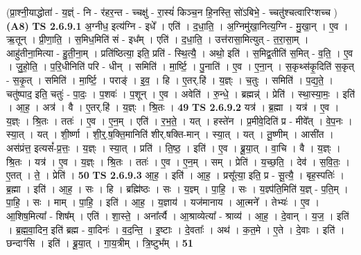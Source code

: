 \documentclass[17pt]{extarticle}
\begin{document}
                      (प्रा॒श्नी॒याद्धोता॑ - य॒ज्ञ्ं - नि - र॑हर॒न्त - च्चक्षु॑ - रा॒स्यं॑ किञ्च॒न हि॒नस्ति॒ सो॑ऽबिभे॒ - च्चतु॑श्चत्वारिꣳशच्च )  \textbf{(A8)} \newline \newline
                                \textbf{ TS 2.6.9.1} \newline
                  अ॒ग्नीध॒ इत्य॑ग्नि - इधे᳚ । एति॑ । द॒धा॒ति॒ । अ॒ग्निमु॑खा॒नित्य॒ग्नि - मु॒खा॒न् । ए॒व । ऋ॒तून् । प्री॒णा॒ति॒ । स॒मिध॒मिति॑ सं - इध᳚म् । एति॑ । द॒धा॒ति॒ । उत्त॑रासा॒मित्युत् - त॒रा॒सा॒म् । आहु॑तीना॒मित्या - हु॒ती॒ना॒म् । प्रति॑ष्ठित्या॒ इति॒ प्रति॑ - स्थि॒त्यै॒ । अथो॒ इति॑ । स॒मिद्व॒तीति॑ स॒मित् - व॒ति॒ । ए॒व । जु॒हो॒ति॒ । प॒रि॒धीनिति॑ परि - धीन् । समिति॑ । मा॒र्ष्टि॒ । पु॒नाति॑ । ए॒व । ए॒ना॒न् । स॒कृथ्स॑कृ॒दिति॑ स॒कृत् - स॒कृ॒त् । समिति॑ । मा॒र्ष्टि॒ । पराङ्॑ । इ॒व॒ । हि । ए॒तर्.हि॑ । य॒ज्ञ्ः । च॒तुः । समिति॑ । प॒द्य॒ते॒ । चतु॑ष्पाद॒ इति॒ चतुः॑ - पा॒दः॒ । प॒शवः॑ । प॒शून् । ए॒व । अवेति॑ । रु॒न्धे॒ । ब्रह्मन्न्॑ । प्रेति॑ । स्था॒स्या॒मः॒ । इति॑ । आ॒ह॒ । अत्र॑ । वै । ए॒तर्.हि॑ । य॒ज्ञ्ः । श्रि॒तः । \textbf{  49} \newline
                  \newline
                                \textbf{ TS 2.6.9.2} \newline
                  यत्र॑ । ब्र॒ह्मा । यत्र॑ । ए॒व । य॒ज्ञ्ः । श्रि॒तः । ततः॑ । ए॒व । ए॒न॒म् । एति॑ । र॒भ॒ते॒ । यत् । हस्ते॑न । प्र॒मीवे॒दिति॑ प्र - मीवे᳚त् । वे॒प॒नः । स्या॒त् । यत् । शी॒र्ष्णा । शी॒र्॒.ष॒क्ति॒मानिति॑ शीर्.षक्ति-मान् । स्या॒त् । यत् । तू॒ष्णीम् । आसी॑त । अस॑प्रंत्त॒ इत्यसं᳚-प्र॒त्तः॒ । य॒ज्ञ्ः । स्या॒त् । प्रति॑ । ति॒ष्ठ॒ । इति॑ । ए॒व । ब्रू॒या॒त् । वा॒चि । वै । य॒ज्ञ्ः । श्रि॒तः । यत्र॑ । ए॒व । य॒ज्ञ्ः । श्रि॒तः । ततः॑ । ए॒व । ए॒न॒म् । सम् । प्रेति॑ । य॒च्छ॒ति॒ । देव॑ । स॒वि॒तः॒ । ए॒तत् । ते॒ । प्रेति॑ । \textbf{  50} \newline
                  \newline
                                \textbf{ TS 2.6.9.3} \newline
                  आ॒ह॒ । इति॑ । आ॒ह॒ । प्रसू᳚त्या॒ इति॒ प्र - सू॒त्यै॒ । बृह॒स्पतिः॑ । ब्र॒ह्मा । इति॑ । आ॒ह॒ । सः । हि । ब्रह्मि॑ष्ठः । सः । य॒ज्ञ्म् । पा॒हि॒ । सः । य॒ज्ञ्प॑ति॒मिति॑ य॒ज्ञ् - प॒ति॒म् । पा॒हि॒ । सः । माम् । पा॒हि॒ । इति॑ । आ॒ह॒ । य॒ज्ञाय॑ । यज॑मानाय । आ॒त्मने᳚ । तेभ्यः॑ । ए॒व । आ॒शिष॒मित्या᳚ - शिष᳚म् । एति॑ । शा॒स्ते॒ । अना᳚र्त्यै । आ॒श्राव्येत्या᳚ - श्राव्य॑ । आ॒ह॒ । दे॒वान् । य॒ज॒ । इति॑ । ब्र॒ह्म॒वा॒दिन॒ इति॑ ब्रह्म - वा॒दिनः॑ । व॒द॒न्ति॒ । इ॒ष्टाः । दे॒वताः᳚ । अथ॑ । क॒त॒मे । ए॒ते । दे॒वाः । इति॑ । छन्दाꣳ॑सि । इति॑ । ब्रू॒या॒त् । गा॒य॒त्रीम् । त्रि॒ष्टुभ᳚म् । \textbf{  51} \newline
\end{document}
